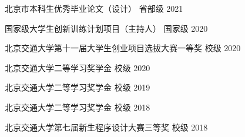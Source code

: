 



\begin{cvhonors}
	\cvhonor
	{北京市本科生优秀毕业论文（设计）} %
	{省部级} %
	{2021} %

	\cvhonor
	{国家级大学生创新训练计划项目（主持人）} %
	{国家级} %
	{2020} %
	
	\cvhonor
	{北京交通大学第十一届大学生创业项目选拔大赛一等奖} %
	{校级} %
	{2020} %

	\cvhonor
	{北京交通大学二等学习奖学金} %
	{校级} %
	{2020} %

  \cvhonor
    {北京交通大学二等学习奖学金} %
    {校级} %
    {2019} %
    
	\cvhonor
	{北京交通大学二等学习奖学金} %
	{校级} %
	{2018} %

	\cvhonor
	{北京交通大学第七届新生程序设计大赛三等奖} %
	{校级} %
	{2018} %

\end{cvhonors}




